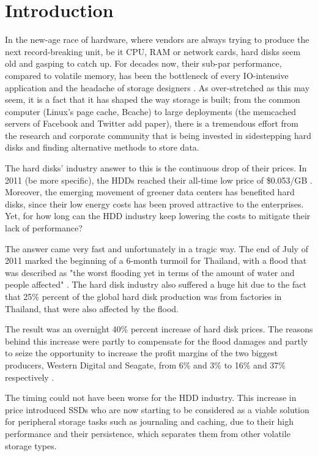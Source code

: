 \chapter{Introduction}\label{ch:intro}

In the new-age race of hardware, where vendors are always trying to produce the 
next record-breaking unit, be it CPU, RAM or network cards, hard disks seem old 
and gasping to catch up. For decades now, their sub-par performance, compared 
to volatile memory, has been the bottleneck of every IO-intensive application 
and the headache of storage designers \cite{nvm}. As over-stretched as this may 
seem, it is a fact that it has shaped the way storage is built; from the common 
computer (Linux's page cache, Bcache) to large deployments (the memcached 
servers of Facebook and Twitter \fixme add paper), there is a tremendous effort 
from the research and corporate community that is being invested in 
sidestepping hard disks and finding alternative methods to store data.

The hard disks' industry answer to this is the continuous drop of their prices.  
In 2011 (\fixme be more specific), the HDDs reached their all-time low price of 
\$0.053/GB \cite{hdd-price}. Moreover, the emerging movement of greener data 
centers has benefited hard disks, since their low energy costs has been proved 
attractive to the enterprises. Yet, for how long can the HDD industry keep 
lowering the costs to mitigate their lack of performance?

The answer came very fast and unfortunately in a tragic way. The end of July of 
2011 marked the beginning of a 6-month turmoil for Thailand, with a flood that 
was described as "the worst flooding yet in terms of the amount of water and 
people affected" \cite{flood}. The hard disk industry also suffered a huge hit 
due to the fact that 25\% percent of the global hard disk production was from 
factories in Thailand, that were also affected by the flood.

The result was an overnight 40\% percent increase of hard disk prices. The 
reasons behind this increase were partly to compensate for the flood damages 
and partly to seize the opportunity to increase the profit margins of the two 
biggest producers, Western Digital and Seagate, from 6\% and 3\% to 16\% and 
37\% respectively \cite{rosenthal12-unesco}.

The timing could not have been worse for the HDD industry. This increase in 
price introduced SSDs who are now starting to be considered as a viable 
solution for peripheral storage tasks such as journaling and caching, due to 
their high performance and their persistence, which separates them from other 
volatile storage types.


